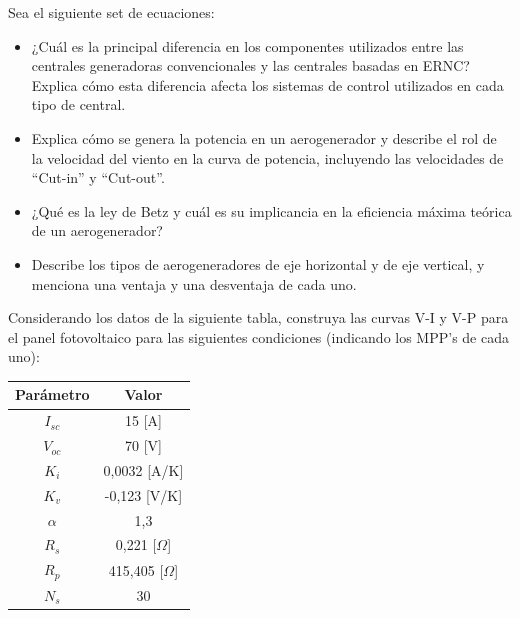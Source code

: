 \documentclass[
  11pt,
  letterpaper,
   addpoints,
   answers
  ]{exam}
\begin{document}
\vspace{0.5cm}
\noindent
\vspace{.85cm}
\begin{questions}
  \question Sea el siguiente set de ecuaciones:
  \begin{itemize}
    \item ¿Cuál es la principal diferencia en los componentes utilizados entre las centrales generadoras convencionales y las centrales basadas en ERNC? Explica cómo esta diferencia afecta los sistemas de control utilizados en cada tipo de central.
    
    \item Explica cómo se genera la potencia en un aerogenerador y describe el rol de la velocidad del viento en la curva de potencia, incluyendo las velocidades de ``Cut-in'' y ``Cut-out''.
    
    \item  ¿Qué es la ley de Betz y cuál es su implicancia en la eficiencia máxima teórica de un aerogenerador?
    
    \item Describe los tipos de aerogeneradores de eje horizontal y de eje vertical, y menciona una ventaja y una desventaja de cada uno.
\end{itemize}
    \question Considerando los datos de la siguiente tabla, construya las curvas V-I y V-P para el panel fotovoltaico para las siguientes condiciones (indicando los MPP's de cada uno):

    \begin{table}[h!]
        \centering
        \begin{tabular}{|c|c|}
            \hline
            \textbf{Parámetro} & \textbf{Valor} \\
            \hline
            $I_{sc}$ & 15 [A] \\
            $V_{oc}$ & 70 [V] \\
            $K_i$ & 0,0032 [A/K] \\
            $K_v$ & -0,123 [V/K] \\
            $\alpha$ & 1,3 \\
            $R_s$ & 0,221 [$\Omega$] \\
            $R_p$ & 415,405 [$\Omega$] \\
            $N_s$ & 30 \\
            \hline
        \end{tabular}
    \end{table}
    

\end{questions}
\end{document}
